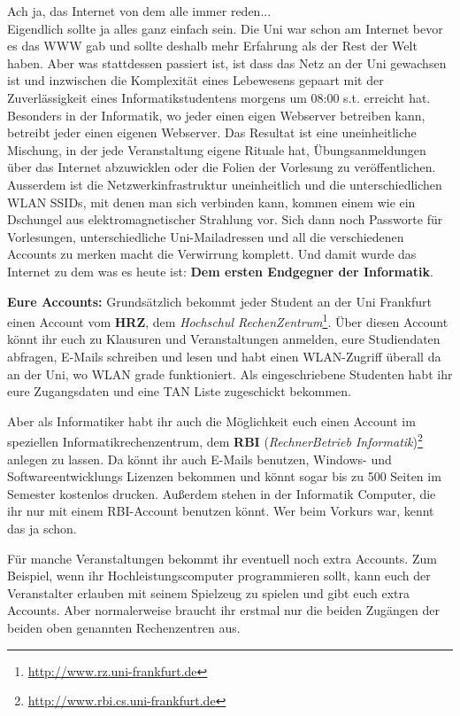 Ach ja, das Internet von dem alle immer reden...\\

\spaltenanfang
Eigendlich sollte ja alles ganz einfach sein.
Die Uni war schon am Internet bevor es das WWW gab und sollte deshalb mehr Erfahrung als der Rest der Welt haben.
Aber was stattdessen passiert ist, ist dass das Netz an der Uni gewachsen ist und inzwischen die Komplexit\"at eines Lebewesens gepaart mit der Zuverl\"assigkeit eines Informatikstudentens morgens um 08:00 s.t. erreicht hat. Besonders in der Informatik, wo jeder einen eigen Webserver betreiben kann, betreibt jeder einen eigenen Webserver. Das Resultat ist eine uneinheitliche Mischung, in der jede Veranstaltung eigene Rituale hat, \"Ubungsanmeldungen \"uber das Internet abzuwicklen oder die Folien der Vorlesung zu ver\"offentlichen. Ausserdem ist die Netzwerkinfrastruktur uneinheitlich und die unterschiedlichen WLAN SSIDs, mit denen man sich verbinden kann, kommen einem wie ein Dschungel aus elektromagnetischer Strahlung vor. Sich dann noch Passworte f\"ur Vorlesungen, unterschiedliche Uni-Mailadressen und all die verschiedenen Accounts zu merken macht die Verwirrung komplett.  Und damit wurde das Internet zu dem was es heute ist: \textbf{Dem ersten Endgegner der Informatik}.

\textbf{Eure Accounts:}
Grunds\"atzlich bekommt jeder Student an der Uni Frankfurt einen Account vom \textbf{HRZ}, dem \textit{Hochschul RechenZentrum}\footnote{\url{http://www.rz.uni-frankfurt.de}}.
\"Uber diesen Account k\"onnt ihr euch zu Klausuren und Veranstaltungen anmelden, eure Studiendaten abfragen, E-Mails schreiben und lesen und habt einen WLAN-Zugriff \"uberall da an der Uni, wo WLAN grade funktioniert. Als eingeschriebene Studenten habt ihr eure Zugangsdaten und eine TAN Liste zugeschickt bekommen. 

Aber als Informatiker habt ihr auch die M\"oglichkeit euch einen Account im speziellen Informatikrechenzentrum, dem \textbf{RBI} (\textit{RechnerBetrieb Informatik})\footnote{\url{http://www.rbi.cs.uni-frankfurt.de}} anlegen zu lassen. Da k\"onnt ihr auch E-Mails benutzen, Windows- und Softwareentwicklungs Lizenzen bekommen und k\"onnt sogar bis zu 500 Seiten im Semester kostenlos drucken. Au{\ss}erdem stehen in der Informatik Computer, die ihr nur mit einem RBI-Account benutzen k\"onnt. Wer beim Vorkurs war, kennt das ja schon.

F\"ur manche Veranstaltungen bekommt ihr eventuell noch extra Accounts. Zum Beispiel, wenn ihr Hochleistungscomputer programmieren sollt, kann euch der Veranstalter erlauben mit seinem Spielzeug zu spielen und gibt euch extra Accounts. Aber normalerweise braucht ihr erstmal nur die beiden Zug\"angen der beiden oben genannten Rechenzentren aus.

